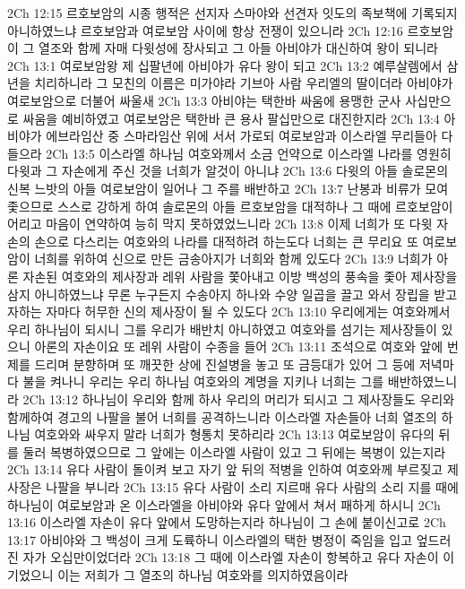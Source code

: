 2Ch 12:15  르호보암의 시종 행적은 선지자 스마야와 선견자 잇도의 족보책에 기록되지 아니하였느냐 르호보암과 여로보암 사이에 항상 전쟁이 있으니라
2Ch 12:16  르호보암이 그 열조와 함께 자매 다윗성에 장사되고 그 아들 아비야가 대신하여 왕이 되니라
2Ch 13:1  여로보암왕 제 십팔년에 아비야가 유다 왕이 되고
2Ch 13:2  예루살렘에서 삼년을 치리하니라 그 모친의 이름은 미가야라 기브아 사람 우리엘의 딸이더라 아비야가 여로보암으로 더불어 싸울새
2Ch 13:3  아비야는 택한바 싸움에 용맹한 군사 사십만으로 싸움을 예비하였고 여로보암은 택한바 큰 용사 팔십만으로 대진한지라
2Ch 13:4  아비야가 에브라임산 중 스마라임산 위에 서서 가로되 여로보암과 이스라엘 무리들아 다 들으라
2Ch 13:5  이스라엘 하나님 여호와께서 소금 언약으로 이스라엘 나라를 영원히 다윗과 그 자손에게 주신 것을 너희가 알것이 아니냐
2Ch 13:6  다윗의 아들 솔로몬의 신복 느밧의 아들 여로보암이 일어나 그 주를 배반하고
2Ch 13:7  난봉과 비류가 모여 좇으므로 스스로 강하게 하여 솔로몬의 아들 르호보암을 대적하나 그 때에 르호보암이 어리고 마음이 연약하여 능히 막지 못하였었느니라
2Ch 13:8  이제 너희가 또 다윗 자손의 손으로 다스리는 여호와의 나라를 대적하려 하는도다 너희는 큰 무리요 또 여로보암이 너희를 위하여 신으로 만든 금송아지가 너희와 함께 있도다
2Ch 13:9  너희가 아론 자손된 여호와의 제사장과 레위 사람을 쫓아내고 이방 백성의 풍속을 좇아 제사장을 삼지 아니하였느냐 무론 누구든지 수송아지 하나와 수양 일곱을 끌고 와서 장립을 받고자하는 자마다 허무한 신의 제사장이 될 수 있도다
2Ch 13:10  우리에게는 여호와께서 우리 하나님이 되시니 그를 우리가 배반치 아니하였고 여호와를 섬기는 제사장들이 있으니 아론의 자손이요 또 레위 사람이 수종을 들어
2Ch 13:11  조석으로 여호와 앞에 번제를 드리며 분향하며 또 깨끗한 상에 진설병을 놓고 또 금등대가 있어 그 등에 저녁마다 불을 켜나니 우리는 우리 하나님 여호와의 계명을 지키나 너희는 그를 배반하였느니라
2Ch 13:12  하나님이 우리와 함께 하사 우리의 머리가 되시고 그 제사장들도 우리와 함께하여 경고의 나팔을 불어 너희를 공격하느니라 이스라엘 자손들아 너희 열조의 하나님 여호와와 싸우지 말라 너희가 형통치 못하리라
2Ch 13:13  여로보암이 유다의 뒤를 둘러 복병하였으므로 그 앞에는 이스라엘 사람이 있고 그 뒤에는 복병이 있는지라
2Ch 13:14  유다 사람이 돌이켜 보고 자기 앞 뒤의 적병을 인하여 여호와께 부르짖고 제사장은 나팔을 부니라
2Ch 13:15  유다 사람이 소리 지르매 유다 사람의 소리 지를 때에 하나님이 여로보암과 온 이스라엘을 아비야와 유다 앞에서 쳐서 패하게 하시니
2Ch 13:16  이스라엘 자손이 유다 앞에서 도망하는지라 하나님이 그 손에 붙이신고로
2Ch 13:17  아비야와 그 백성이 크게 도륙하니 이스라엘의 택한 병정이 죽임을 입고 엎드러진 자가 오십만이었더라
2Ch 13:18  그 때에 이스라엘 자손이 항복하고 유다 자손이 이기었으니 이는 저희가 그 열조의 하나님 여호와를 의지하였음이라
